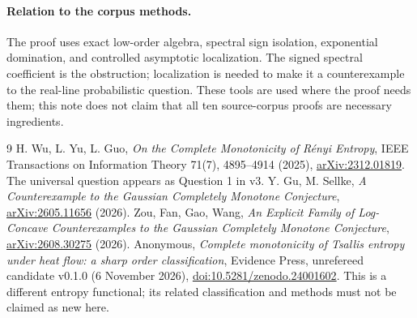 \documentclass[11pt]{article}
\begin{document}
\paragraph{Relation to the corpus methods.}
The proof uses exact low-order algebra, spectral sign isolation, exponential domination, and controlled asymptotic localization. The signed spectral coefficient is the obstruction; localization is needed to make it a counterexample to the real-line probabilistic question. These tools are used where the proof needs them; this note does not claim that all ten source-corpus proofs are necessary ingredients.

\begin{thebibliography}{9}
 H. Wu, L. Yu, L. Guo, \emph{On the Complete Monotonicity of R\'enyi Entropy}, IEEE Transactions on Information Theory 71(7), 4895--4914 (2025), \href{https://arxiv.org/abs/2312.01819}{arXiv:2312.01819}. The universal question appears as Question 1 in v3.
 Y. Gu, M. Sellke, \emph{A Counterexample to the Gaussian Completely Monotone Conjecture}, \href{https://arxiv.org/abs/2605.11656}{arXiv:2605.11656} (2026).
 Zou, Fan, Gao, Wang, \emph{An Explicit Family of Log-Concave Counterexamples to the Gaussian Completely Monotone Conjecture}, \href{https://arxiv.org/abs/2608.30275}{arXiv:2608.30275} (2026).
 Anonymous, \emph{Complete monotonicity of Tsallis entropy under heat flow: a sharp order classification}, Evidence Press, unrefereed candidate v0.1.0 (6 November 2026), \href{https://doi.org/10.5281/zenodo.24001602}{doi:10.5281/zenodo.24001602}. This is a different entropy functional; its related classification and methods must not be claimed as new here.
\end{thebibliography}
\end{document}
